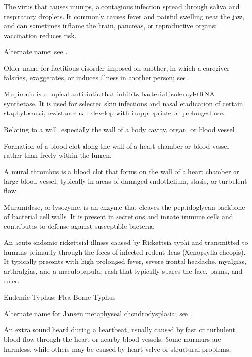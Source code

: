  The virus that causes mumps, a contagious infection spread through saliva and respiratory droplets. It commonly causes fever and painful swelling near the jaw, and can sometimes inflame the brain, pancreas, or reproductive organs; vaccination reduces risk.

 Alternate name; see .

 Older name for factitious disorder imposed on another, in which a caregiver falsifies, exaggerates, or induces illness in another person; see .

 Mupirocin is a topical antibiotic that inhibits bacterial isoleucyl-tRNA synthetase. It is used for selected skin infections and nasal eradication of certain staphylococci; resistance can develop with inappropriate or prolonged use.

 Relating to a wall, especially the wall of a body cavity, organ, or blood vessel.

 Formation of a blood clot along the wall of a heart chamber or blood vessel rather than freely within the lumen.

 A mural thrombus is a blood clot that forms on the wall of a heart chamber or large
blood vessel, typically in areas of damaged endothelium, stasis, or turbulent flow.

 Muramidase, or lysozyme, is an enzyme that cleaves the peptidoglycan backbone of bacterial cell walls. It is present in secretions and innate immune cells and contributes to defense against susceptible bacteria.

 An acute endemic rickettsial illness caused by Rickettsia typhi and transmitted to humans primarily through the feces of infected rodent fleas (Xenopsylla cheopis). It typically presents with high prolonged fever, severe frontal headache, myalgias, arthralgias, and a maculopapular rash that typically spares the face, palms, and soles.

\synonyms
Endemic Typhus; Flea-Borne Typhus

 Alternate name for Jansen metaphyseal chondrodysplasia; see .

 An extra sound heard during a heartbeat, usually caused by fast or turbulent blood flow through the
heart or nearby blood vessels. Some murmurs are harmless, while others may be caused by heart valve or
structural problems.

